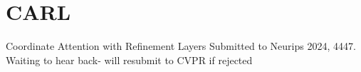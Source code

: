 \documentclass{beamer}
\begin{document}
\section{CARL}

\begin{frame}{Coordinate Attention with Refinement Layers}
	Submitted to Neurips 2024, 4447.
	Waiting to hear back- will resubmit to CVPR if rejected
\end{frame}

\begin{frame}
\end{frame}

\begin{frame}
\end{frame}
\begin{frame}
\end{frame}
\end{document}
